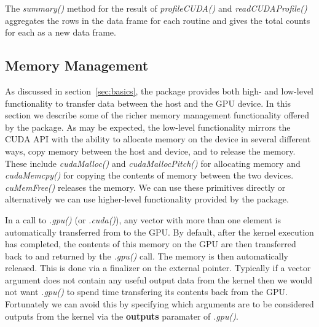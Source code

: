 \documentclass[article]{jss}
\def\R{\proglang{R}}
\def\Rpkg#1{\pkg{#1}}
\def\Rfunc#1{\textsl{#1()}}
\def\Rarg#1{\textbf{#1}}
\begin{document}
The \Rfunc{summary} method for the result of \Rfunc{profileCUDA} and
\Rfunc{readCUDAProfile} aggregates the rows in the data frame for each
routine and gives the total counts for each as a new data frame.

\subsection{Memory Management}
As discussed in section~\ref{sec:basics}, the \Rpkg{RCUDA} package provides
both high- and low-level functionality to transfer data between the host
and the GPU device. In this section we describe some of the richer
memory management functionality offered by the package.
As may be expected, the low-level functionality mirrors the CUDA 
API with the ability to
allocate memory on the device in several different ways, copy memory
between the host and device, and to release the memory.  These include
\Rfunc{cudaMalloc} and \Rfunc{cudaMallocPitch} for allocating memory
and \Rfunc{cudaMemcpy} for copying the contents of memory between the
two devices.  \Rfunc{cuMemFree} releases the memory.
We can use these primitives directly or alternatively
we can use higher-level functionality provided by the package.

In a call to \Rfunc{.gpu} (or \Rfunc{.cuda}), any \R{} vector with
more than one element is automatically transferred from \R{} to the
GPU.  By default, after the kernel execution has completed, the
contents of this memory on the GPU are then transferred back to \R{}
and returned by the \Rfunc{.gpu} call.  The memory is then automatically
released. This is done via a finalizer on the external pointer.
Typically if a vector argument does not contain any useful output data from the
kernel then we would not want \Rfunc{.gpu} to spend time transfering
its contents back from the GPU. Fortunately we can avoid this by 
specifying which arguments are to be considered outputs from the kernel
via the \Rarg{outputs} paramater of \Rfunc{.gpu}.

%
\end{document}
